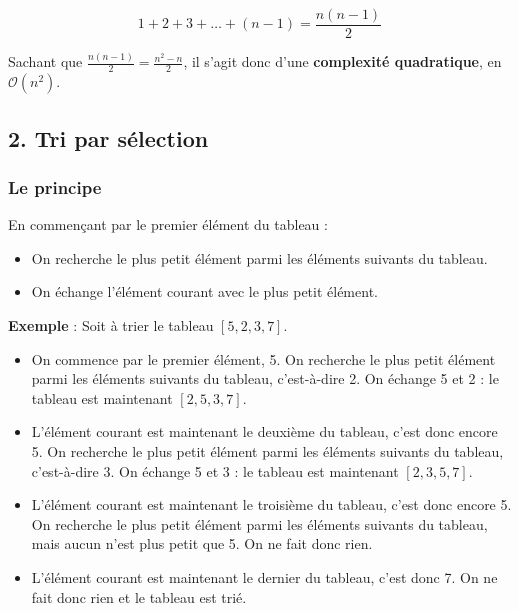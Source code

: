 \documentclass[
  french,
  a4paper,
  DIV=11,
  numbers=noendperiod]{scrartcl}
\providecommand{\tightlist}{%
  \setlength{\itemsep}{0pt}\setlength{\parskip}{0pt}}
\begin{document}
\[1+2+3+\ldots+(n-1)=\frac{n(n-1)}{2}\]

Sachant que \(\frac{n(n-1)}{2} = \frac{n^2-n}{2}\), il s'agit donc d'une
\textbf{complexité quadratique}, en \(\mathcal{O}(n^2)\).

\subsection{2. Tri par sélection}\label{tri-par-suxe9lection}

\protect{}\label{selection}

\subsubsection{Le principe}\label{le-principe-1}

\begin{tcolorbox}[enhanced jigsaw, arc=.35mm, bottomrule=.15mm, bottomtitle=1mm, breakable, colback=white, colbacktitle=quarto-callout-important-color!10!white, colframe=quarto-callout-important-color-frame, coltitle=black, left=2mm, leftrule=.75mm, opacityback=0, opacitybacktitle=0.6, rightrule=.15mm, title=\textcolor{quarto-callout-important-color}{\faExclamation}\hspace{0.5em}{Principe de l'algorithme}, titlerule=0mm, toprule=.15mm, toptitle=1mm]

En commençant par le premier élément du tableau :

\begin{itemize}
\tightlist
\item
  On recherche le plus petit élément parmi les éléments suivants du
  tableau.
\item
  On échange l'élément courant avec le plus petit élément.
\end{itemize}

\end{tcolorbox}

\textbf{Exemple} : Soit à trier le tableau \([5,2,3,7]\).

\begin{itemize}
\tightlist
\item
  On commence par le premier élément, 5. On recherche le plus petit
  élément parmi les éléments suivants du tableau, c'est-à-dire 2. On
  échange 5 et 2 : le tableau est maintenant \([2,5,3,7]\).
\item
  L'élément courant est maintenant le deuxième du tableau, c'est donc
  encore 5. On recherche le plus petit élément parmi les éléments
  suivants du tableau, c'est-à-dire 3. On échange 5 et 3 : le tableau
  est maintenant \([2,3,5,7]\).
\item
  L'élément courant est maintenant le troisième du tableau, c'est donc
  encore 5. On recherche le plus petit élément parmi les éléments
  suivants du tableau, mais aucun n'est plus petit que 5. On ne fait
  donc rien.
\item
  L'élément courant est maintenant le dernier du tableau, c'est donc 7.
  On ne fait donc rien et le tableau est trié.
\end{itemize}
\end{document}
